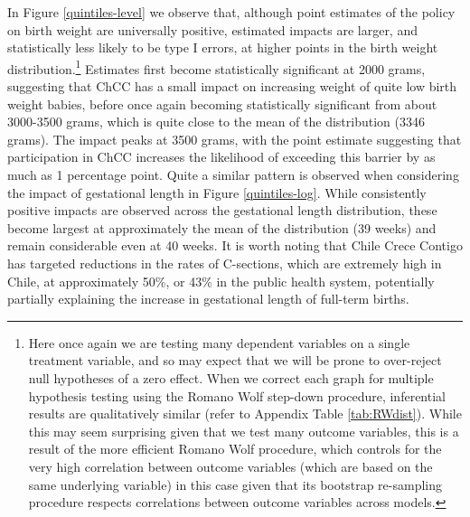 \documentclass[12pt]{article}
\begin{document}
\begin{spacing}{1.4}
In Figure \ref{quintiles-level} we observe that, although point estimates
of the policy on birth weight are universally positive, estimated impacts
are larger, and statistically less likely to be type I errors, at higher
points in the birth weight distribution.\footnote{Here once again we are
  testing many dependent variables on a single treatment variable, and so
  may expect that we will be prone to over-reject null hypotheses of a
  zero effect.  When we correct each graph for multiple hypothesis
  testing using the Romano Wolf step-down procedure, inferential results
  are qualitatively similar (refer to Appendix Table \ref{tab:RWdist}).
  While this may seem surprising given that we test many outcome variables,
  this is a result of the more efficient Romano Wolf procedure, which
  controls for the very high correlation between outcome variables (which
  are based on the same underlying variable) in this case given that its
  bootstrap re-sampling procedure respects correlations between outcome
  variables across models.}  Estimates
first become statistically
significant at 2000 grams, suggesting that ChCC has a small impact on
increasing weight of quite low birth weight babies, before once again
becoming statistically significant from about 3000-3500 grams, which is
quite close to the mean of the distribution (3346 grams).  The impact
peaks at 3500 grams, with the point estimate suggesting that participation
in ChCC increases the likelihood of exceeding this barrier by as much as
1 percentage point.  Quite a similar pattern is observed when considering
the impact of gestational length in Figure \ref{quintiles-log}. While
consistently positive impacts are observed across the gestational length
distribution, these become largest at approximately the mean of the
distribution (39 weeks) and remain considerable even at 40 weeks.  It is
worth noting that Chile Crece Contigo has targeted reductions in the
rates of C-sections, which are extremely high in Chile, at approximately
50\%, or 43\% in the public health system, potentially partially
explaining the increase in gestational length of full-term births. 


\end{spacing}
\end{document}
